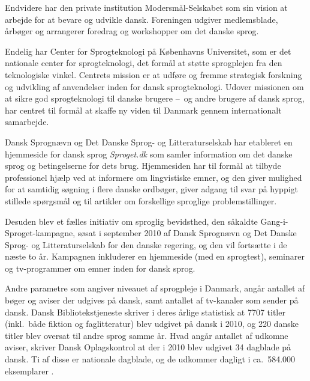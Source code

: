 \begin{multicols}{2}

Endvidere har den private institution Moders\-m\aa l-Selskabet som sin vision at arbejde for at bevare og udvikle dansk. Foreningen udgiver medlemsblade, \aa rb\o ger og arrangerer foredrag og workshopper om det danske sprog.


Endelig har Center for Sprogteknologi \mbox{p\aa} K\o benhavns Universitet, som er det nationale center for sprogtekno\-logi, det form\aa l at st\o tte sprogplejen fra den teknologiske vinkel. Centrets mission er at udf\o re og fremme strategisk forskning og udvikling af anvendelser inden for dansk sprogteknologi. Udover missionen om at sikre god sprogteknologi til danske brugere --~og andre brugere af dansk sprog, har centret til form\aa l at skaffe ny viden til Danmark gennem internationalt samarbejde.

Dansk Sprogn\ae vn og Det Danske Sprog- og Litteraturselskab har etableret en hjemmeside for dansk sprog {\it Sproget.dk} som samler information om det danske sprog og betingelserne for dets brug. Hjemmesiden har til form\aa l at tilbyde professionel hj\ae lp ved at informere om lingvistiske emner, og den giver mulighed for at samtidig s\o gning i flere danske ordb\o ger, giver adgang til svar \mbox{p\aa} hyppigt stillede sp\o rgsm\aa l og til artikler om forskellige sproglige problemstillinger.

\sloppy
Desuden blev et f\ae lles initiativ om sproglig bevidsthed, den s\aa kaldte Gang-i-Sproget-kampagne, s\o sat i september 2010 af Dansk Sprogn\ae vn og Det Danske Sprog- og Litteraturselskab for den danske regering, og den vil forts\ae tte i de n\ae ste to \aa r. Kampagnen inkluderer en hjemmeside (med en sprogtest), seminarer og tv-programmer om emner inden for dansk sprog.

Andre parametre som angiver niveauet af sprogpleje i Danmark, ang\aa r antallet af b\o ger og aviser der udgives \mbox{p\aa} dansk, samt antallet af tv-kanaler som sender \mbox{p\aa} dansk. Dansk Bibliotekstjeneste skriver i deres \aa rlige statistisk at 7707 titler (inkl.\ b\aa de fiktion og faglitte\-ratur) blev udgivet \mbox{p\aa} dansk i 2010, og 220 danske titler blev oversat til andre sprog samme \aa r. Hvad ang\aa r antallet af udkomne aviser, skriver Dansk Oplagskontrol at der i 2010 blev udgivet 34 dagblade \mbox{p\aa} dansk. Ti af disse er nationale dagblade, og de udkommer dagligt i ca.\ 584.000 eksemplarer \cite{ddo}.


\end{multicols}
